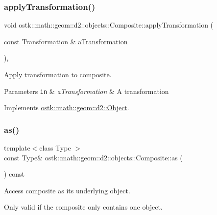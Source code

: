 \subsubsection{\texorpdfstring{apply\+Transformation()}{applyTransformation()}}
{\footnotesize\ttfamily void ostk\+::math\+::geom\+::d2\+::objects\+::\+Composite\+::apply\+Transformation (\begin{DoxyParamCaption}\item[{const \hyperlink{classostk_1_1math_1_1geom_1_1d2_1_1_transformation}{Transformation} \&}]{a\+Transformation }\end{DoxyParamCaption})\hspace{0.3cm}{\ttfamily [override]}, {\ttfamily [virtual]}}



Apply transformation to composite. 


\begin{DoxyParams}[1]{Parameters}
\mbox{\tt in}  & {\em a\+Transformation} & A transformation \\
\hline
\end{DoxyParams}


Implements \hyperlink{classostk_1_1math_1_1geom_1_1d2_1_1_object_a959e50211d7a680f7f904bbb752d75c9}{ostk\+::math\+::geom\+::d2\+::\+Object}.

\mbox{\label{classostk_1_1math_1_1geom_1_1d2_1_1objects_1_1_composite_acfbcd98d849fe8bc29f0ee18d780bac6}} 
\subsubsection{\texorpdfstring{as()}{as()}}
{\footnotesize\ttfamily template$<$class Type $>$ \\
const Type\& ostk\+::math\+::geom\+::d2\+::objects\+::\+Composite\+::as (\begin{DoxyParamCaption}{ }\end{DoxyParamCaption}) const\hspace{0.3cm}{\ttfamily [inline]}}



Access composite as its underlying object. 

Only valid if the composite only contains one object.

